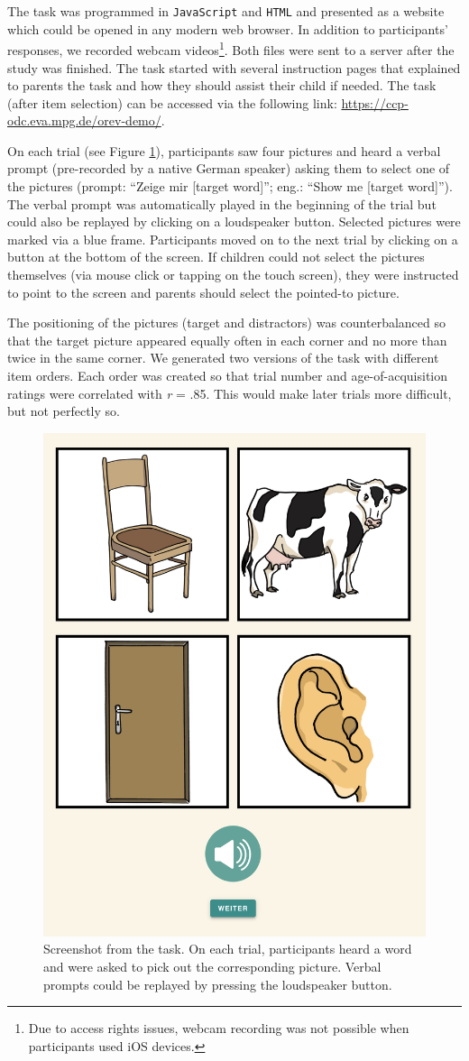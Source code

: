 \documentclass[
  man,floatsintext]{apa6}
\begin{document}
The task was programmed in \texttt{JavaScript} and \texttt{HTML} and presented as a website which could be opened in any modern web browser. In addition to participants' responses, we recorded webcam videos\footnote{Due to access rights issues, webcam recording was not possible when participants used iOS devices.}. Both files were sent to a server after the study was finished. The task started with several instruction pages that explained to parents the task and how they should assist their child if needed. The task (after item selection) can be accessed via the following link: \url{https://ccp-odc.eva.mpg.de/orev-demo/}.

On each trial (see Figure \ref{fig:fig1}), participants saw four pictures and heard a verbal prompt (pre-recorded by a native German speaker) asking them to select one of the pictures (prompt: ``Zeige mir {[}target word{]}''; eng.: ``Show me {[}target word{]}''). The verbal prompt was automatically played in the beginning of the trial but could also be replayed by clicking on a loudspeaker button. Selected pictures were marked via a blue frame. Participants moved on to the next trial by clicking on a button at the bottom of the screen. If children could not select the pictures themselves (via mouse click or tapping on the touch screen), they were instructed to point to the screen and parents should select the pointed-to picture.

The positioning of the pictures (target and distractors) was counterbalanced so that the target picture appeared equally often in each corner and no more than twice in the same corner. We generated two versions of the task with different item orders. Each order was created so that trial number and age-of-acquisition ratings were correlated with \emph{r} = .85. This would make later trials more difficult, but not perfectly so.



\begin{figure}

{\centering \includegraphics[width=0.5\linewidth]{../graphs/task_fig} 

}

\caption{Screenshot from the task. On each trial, participants heard a word and were asked to pick out the corresponding picture. Verbal prompts could be replayed by pressing the loudspeaker button.}\label{fig:fig1}
\end{figure}
\end{document}
